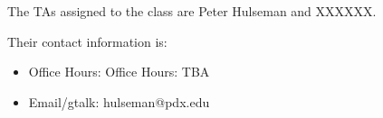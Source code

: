 The TAs assigned to the class are Peter Hulseman and XXXXXX. 

Their contact information is:
\begin{itemize}
 \item Office Hours: Office Hours: TBA
 \item Email/gtalk: hulseman@pdx.edu
\end{itemize}
